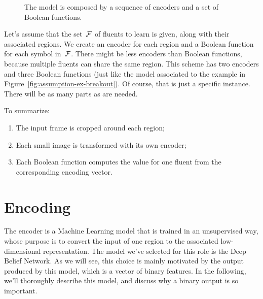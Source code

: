 \begin{figure}
	\caption{The model is composed by a sequence of encoders and a set of
	Boolean functions.}
	\label{fig:model-scheme}
\end{figure}
Let's assume that the set~$\mathcal{F}$ of fluents to learn is given, along with
their associated regions. We create an encoder for each region and a Boolean
function for each symbol in~$\mathcal{F}$. There might be less encoders than
Boolean functions, because multiple fluents can share the same region.
This scheme has two encoders and three Boolean functions (just like the model
associated to the example in Figure~\ref{fig:assumption-ex-breakout}). Of
course, that is just a specific instance. There will be as many parts as are
needed.

To summarize:
\begin{enumerate}
	\item The input frame is cropped around each region;
	\item Each small image is transformed with its own encoder;
	\item Each Boolean function computes the value for one fluent from the
		corresponding encoding vector.
\end{enumerate}


\section{Encoding}

\label{sec:encoding}

The encoder is a Machine Learning model that is trained in an unsupervised
way, whose purpose is to convert the input of one region to the associated
low-dimensional representation. The model we've selected for this role is the
Deep Belief Network. As we will see, this choice is mainly motivated by the
output produced by this model, which is a vector of binary features. In the
following, we'll thoroughly describe this model, and discuss why a binary
output is so important.

